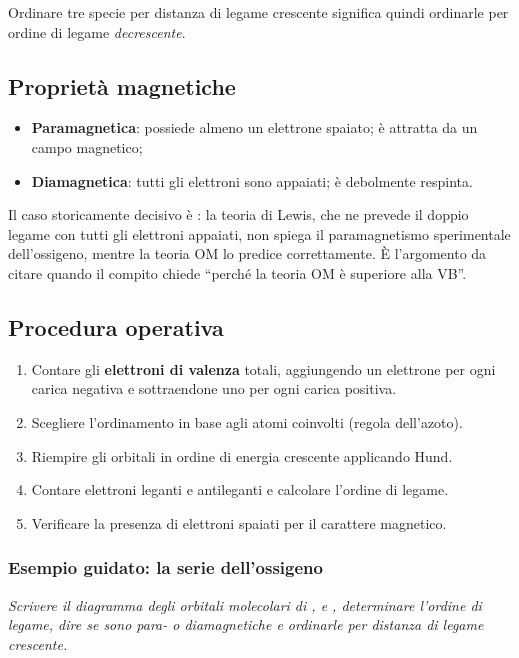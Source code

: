 \documentclass[11pt, a4paper, openright]{book}
\begin{document}
\noindent Ordinare tre specie per distanza di legame crescente significa quindi ordinarle
per ordine di legame \emph{decrescente}.

\subsection{Proprietà magnetiche}

\begin{itemize}
  \item \textbf{Paramagnetica}: possiede almeno un elettrone spaiato; è attratta da un
        campo magnetico;
  \item \textbf{Diamagnetica}: tutti gli elettroni sono appaiati; è debolmente respinta.
\end{itemize}

Il caso storicamente decisivo è : la teoria di Lewis, che ne prevede il doppio
legame con tutti gli elettroni appaiati, non spiega il paramagnetismo sperimentale
dell'ossigeno, mentre la teoria OM lo predice correttamente. È l'argomento da citare quando
il compito chiede ``perché la teoria OM è superiore alla VB''.

\subsection{Procedura operativa}

\begin{enumerate}
  \item Contare gli \textbf{elettroni di valenza} totali, aggiungendo un elettrone per ogni
        carica negativa e sottraendone uno per ogni carica positiva.
  \item Scegliere l'ordinamento in base agli atomi coinvolti (regola dell'azoto).
  \item Riempire gli orbitali in ordine di energia crescente applicando Hund.
  \item Contare elettroni leganti e antileganti e calcolare l'ordine di legame.
  \item Verificare la presenza di elettroni spaiati per il carattere magnetico.
\end{enumerate}

\subsubsection{Esempio guidato: la serie dell'ossigeno}

\emph{Scrivere il diagramma degli orbitali molecolari di ,  e ,
determinare l'ordine di legame, dire se sono para- o diamagnetiche e ordinarle per distanza
di legame crescente.}
\end{document}
